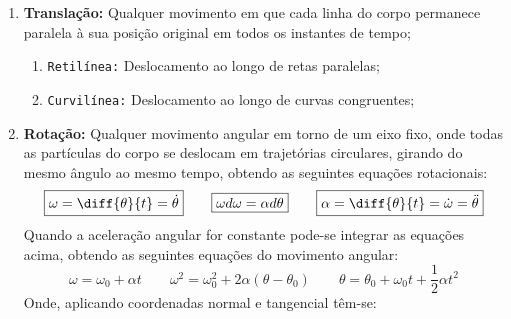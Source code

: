 \documentclass{article}
\begin{document}
                \begin{enumerate}[rightmargin = \leftmargin]
                    \item \textbf{Translação:} Qualquer movimento em que cada linha do corpo permanece paralela à sua posição original em todos os instantes de tempo;
                        \begin{enumerate}[rightmargin = \leftmargin, noitemsep]
                            \item \texttt{Retilínea:} Deslocamento ao longo de retas paralelas;
                            \item \texttt{Curvilínea:} Deslocamento ao longo de curvas congruentes;
                        \end{enumerate}

                    \item \textbf{Rotação:} Qualquer movimento angular em torno de um eixo fixo, onde todas as partículas do corpo se deslocam em trajetórias circulares, girando do mesmo ângulo ao mesmo tempo, obtendo as seguintes equações rotacionais:
                        \begin{equation}
                            \boxed{
                                \omega = \diff{\theta}{t} = \dot{\theta}
                            }
                            \qquad
                            \boxed{
                                \omega d \omega =\alpha d\theta
                            }
                            \qquad
                            \boxed{
                                \alpha = \diff{\theta}{t} = \dot{\omega} = \ddot{\theta}
                            }
                        \end{equation}
                    Quando a aceleração angular for constante pode-se  integrar as equações acima, obtendo as seguintes equações do movimento angular: 
                        \begin{equation}
                            \boxed{
                                \omega = \omega_{0} + \alpha t
                            }
                            \qquad
                            \boxed{
                                \omega^{2} = \omega^{2}_{0} + 2\alpha(\theta - \theta_{0})
                            }
                            \qquad
                            \boxed{
                                \theta = \theta_{0} + \omega_{0} t + \frac{1}{2}\alpha t^{2}
                            }
                        \end{equation}
                    Onde, aplicando coordenadas normal e tangencial têm-se:

\end{enumerate}
\end{document}
